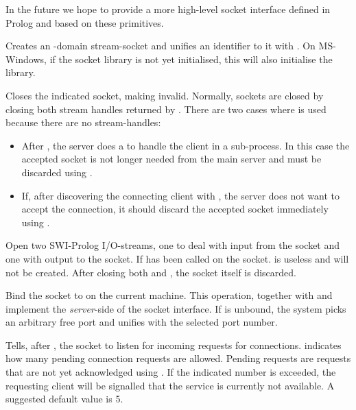 \documentclass[11pt]{article}
\begin{document}
In the future we hope to provide a more high-level socket interface
defined in Prolog and based on these primitives.

\begin{description}
Creates an -domain stream-socket and unifies an identifier
to it with . On MS-Windows, if the socket library is not
yet initialised, this will also initialise the library.

Closes the indicated socket, making  invalid.  Normally,
sockets are closed by closing both stream handles returned by
.  There are two cases where  is used
because there are no stream-handles:

\begin{itemize}
    \item After , the server does a  to handle the client
	  in a sub-process. In this case the accepted socket is not
	  longer needed from the main server and must be discarded
	  using .
    \item If, after discovering the connecting client with ,
          the server does not want to accept the connection, it should
	  discard the accepted socket immediately using .
\end{itemize}

Open two SWI-Prolog I/O-streams, one to deal with input from the socket
and one with output to the socket.  If  has been called on the
socket.  is useless and will not be created. After closing
both  and , the socket itself is discarded.

Bind the socket to  on the current machine.  This operation,
together with  and  implement the {\em server}-side of
the socket interface.  If  is unbound, the system picks an
arbitrary free port and unifies  with the selected port
number.

Tells, after , the socket to listen for incoming requests for
connections.   indicates how many pending connection
requests are allowed.  Pending requests are requests that are not yet
acknowledged using .  If the indicated number is exceeded, the
requesting client will be signalled that the service is currently not
available.  A suggested default value is 5.


\end{description}
\end{document}
